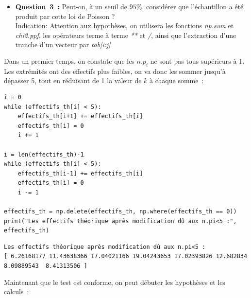 \clearpage
\begin{itemize}[label={},itemindent=-2em,leftmargin=2em]
    \item \textbf{Question~3~:} Peut-on, à un seuil de $95\%$, considérer que l’échantillon a été produit par cette loi de
    Poisson ? \\
    Indication: Attention aux hypothèses, on utilisera les fonctions \textit{np.sum} et \textit{chi2.ppf}, les opérateurs
    terme à terme \textit{**} et \textit{/}, ainsi que l’extraction d’une tranche d’un vecteur par \textit{tab[i:j]}
\end{itemize}
\vspace{.2cm}

Dans un premier temps, on constate que les $n.p_{i}$ ne sont pas tous supérieurs à 1. \\
Les extrémités ont des effectifs plus faibles, on va donc les sommer jusqu'à dépasser 5, tout en réduisant 
de 1 la valeur de $k$ à chaque somme~:

\vspace{.1cm}

\begin{lstlisting}[style=myPython, caption=$n.p_{i} < 5$, frame=lines]
i = 0
while (effectifs_th[i] < 5):
    effectifs_th[i+1] += effectifs_th[i]
    effectifs_th[i] = 0
    i += 1

i = len(effectifs_th)-1
while (effectifs_th[i] < 5):
    effectifs_th[i-1] += effectifs_th[i]
    effectifs_th[i] = 0
    i -= 1

effectifs_th = np.delete(effectifs_th, np.where(effectifs_th == 0))
print("Les effectifs théorique après modification dû aux n.pi<5 :", effectifs_th)
\end{lstlisting}

\begin{lstlisting}[style=myLog, caption=Résultat du code, frame=lines]
Les effectifs théorique après modification dû aux n.pi<5 : 
[ 6.26168177 11.43638366 17.04021166 19.04243653 17.02393826 12.682834 8.09889543  8.41313506 ]
\end{lstlisting}

\vspace{.1cm}

\noindent
Maintenant que le test est conforme, on peut débuter les hypothèses et les calculs~:\\


